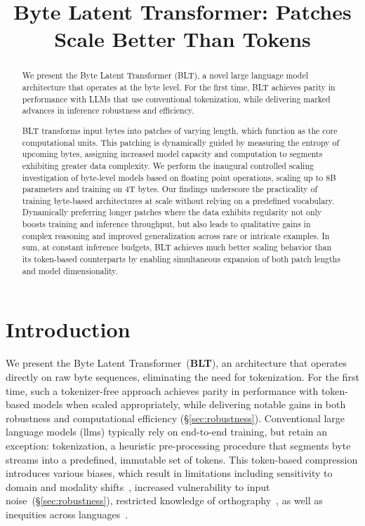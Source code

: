 \title{Byte Latent Transformer: Patches Scale Better Than Tokens}

\begin{abstract}
We present the Byte Latent Transformer (\textsc{BLT}), a novel large language model architecture that operates at the byte level. For the first time, \textsc{BLT} achieves parity in performance with LLMs that use conventional tokenization, while delivering marked advances in inference robustness and efficiency. 

\textsc{BLT} transforms input bytes into patches of varying length, which function as the core computational units. This patching is dynamically guided by measuring the entropy of upcoming bytes, assigning increased model capacity and computation to segments exhibiting greater data complexity. We perform the inaugural controlled scaling investigation of byte-level models based on floating point operations, scaling up to 8B parameters and training on 4T bytes. Our findings underscore the practicality of training byte-based architectures at scale without relying on a predefined vocabulary. Dynamically preferring longer patches where the data exhibits regularity not only boosts training and inference throughput, but also leads to qualitative gains in complex reasoning and improved generalization across rare or intricate examples. In sum, at constant inference budgets, \textsc{BLT} achieves much better scaling behavior than its token-based counterparts by enabling simultaneous expansion of both patch lengths and model dimensionality.
\end{abstract}

\section{Introduction}
\label{section:intro}

We present the Byte Latent Transformer~(\textbf{BLT}), an architecture that operates directly on raw byte sequences, eliminating the need for tokenization. For the first time, such a tokenizer-free approach achieves parity in performance with token-based models when scaled appropriately, while delivering notable gains in both robustness and computational efficiency (\S\ref{sec:robustness}). Conventional large language models (llms) typically rely on end-to-end training, but retain an exception: tokenization, a heuristic pre-processing procedure that segments byte streams into a predefined, immutable set of tokens. This token-based compression introduces various biases, which result in limitations including sensitivity to domain and modality shifts~\citep{dagangetting}, increased vulnerability to input noise~(\S\ref{sec:robustness}), restricted knowledge of orthography~\citep{edman2024cute}, as well as inequities across languages~\citep{liang2023xlm,petrov2024language,limisiewicz2024myte}.

